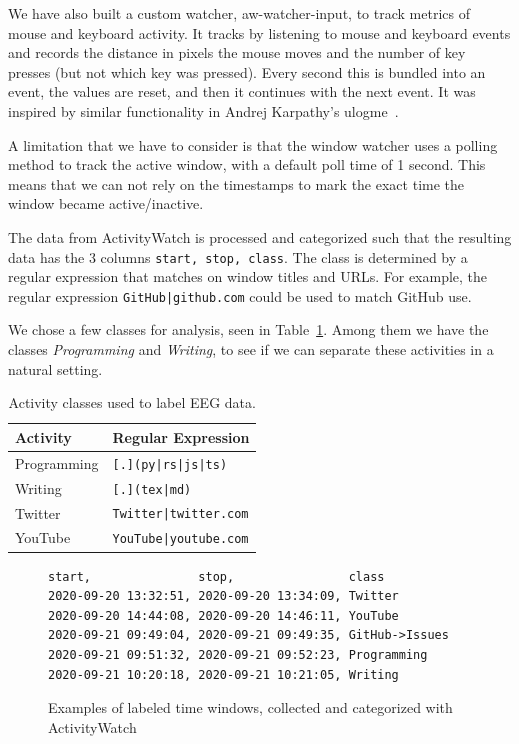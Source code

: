         We have also built a custom watcher, aw-watcher-input\label{section:aw-watcher-input}, to track metrics of mouse and keyboard activity. It tracks by listening to mouse and keyboard events and records the distance in pixels the mouse moves and the number of key presses (but not which key was pressed). Every second this is bundled into an event, the values are reset, and then it continues with the next event. It was inspired by similar functionality in Andrej Karpathy's ulogme~\cite{karpathy_ulogme_2016}.

        A limitation that we have to consider is that the window watcher uses a polling method to track the active window, with a default poll time of 1 second. This means that we can not rely on the timestamps to mark the exact time the window became active/inactive.

        The data from ActivityWatch is processed and categorized such that the resulting data has the 3 columns \texttt{start, stop, class}. The class is determined by a regular expression that matches on window titles and URLs. For example, the regular expression \texttt{GitHub|github.com} could be used to match GitHub use.

We chose a few classes for analysis, seen in Table~\ref{table:activity-classes}. Among them we have the classes \emph{Programming} and \emph{Writing}, to see if we can separate these activities in a natural setting.

\begin{table}[h]
    \centering
    \begin{tabular}{ll}
        \toprule
        \textbf{Activity} & \textbf{Regular Expression} \\
        \midrule
        Programming & \texttt{[.](py|rs|js|ts)} \\
        Writing & \texttt{[.](tex|md)} \\
        Twitter & \texttt{Twitter|twitter.com} \\
        YouTube & \texttt{YouTube|youtube.com} \\
        \bottomrule
    \end{tabular}
    \caption{Activity classes used to label EEG data.}\label{table:activity-classes}
\end{table}

\begin{figure}[h]
\begin{verbatim}
start,               stop,                class
2020-09-20 13:32:51, 2020-09-20 13:34:09, Twitter
2020-09-20 14:44:08, 2020-09-20 14:46:11, YouTube
2020-09-21 09:49:04, 2020-09-21 09:49:35, GitHub->Issues
2020-09-21 09:51:32, 2020-09-21 09:52:23, Programming
2020-09-21 10:20:18, 2020-09-21 10:21:05, Writing
\end{verbatim}
    \caption{Examples of labeled time windows, collected and categorized with ActivityWatch}\label{code:class-csv}
\end{figure}


